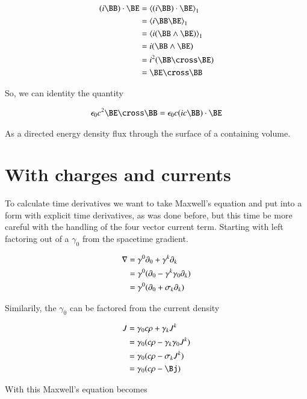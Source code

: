 \documentclass{article}
\begin{document}
\begin{align*}
(i \BB) \cdot \BE 
&= \gpgradeone{ (i \BB) \cdot \BE } \\
&= \gpgradeone{ i \BB \BE } \\
&= \gpgradeone{ i (\BB \wedge \BE) } \\
&= i (\BB \wedge \BE) \\
&= i^2(\BB \cross \BE) \\
&= \BE \cross \BB \\
\end{align*}

So, we can identity the quantity 

\begin{align}\label{eqn:poynting}
\epsilon_0 c^2 \BE \cross \BB = \epsilon_0 c (i c \BB) \cdot \BE 
\end{align}

As a directed energy density flux through the surface of a containing volume.


\section{ With charges and currents }
 
To calculate time derivatives we want to take Maxwell's equation and put into a form with explicit time derivatives, as was done before, but this time be more careful with the handling of the four vector current term.  Starting with left factoring out of a $\gamma_0$ from the spacetime gradient. 
 
\begin{align*}
\nabla &= \gamma^0 \partial_0 + \gamma^k \partial_k \\
&= \gamma^0 (\partial_0 - \gamma^k \gamma_0 \partial_k) \\
&= \gamma^0 (\partial_0 + \sigma_k \partial_k) \\
\end{align*}

Similarily, the $\gamma_0$ can be factored from the current density

\begin{align*}
J 
&= \gamma_0 c \rho + \gamma_k J^k \\
&= \gamma_0 (c \rho - \gamma_k \gamma_0 J^k) \\
&= \gamma_0 (c \rho - \sigma_k J^k) \\
&= \gamma_0 (c \rho - \Bj )
\end{align*}

With this Maxwell's equation becomes
 
\end{document}

